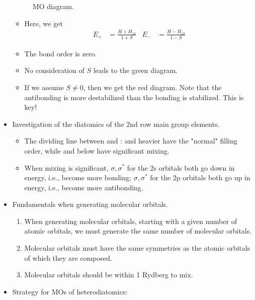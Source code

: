 \documentclass[../notes.tex]{subfiles}
\begin{document}
\begin{itemize}
\begin{figure}[H]
        \caption{ MO diagram.}
        \label{fig:MOsHe2}
    \end{figure}
    \begin{itemize}
        \item Here, we get
        \begin{align*}
            E_+ &= \frac{H+H_{12}}{1+S}&
            E_- &= \frac{H-H_{12}}{1-S}
        \end{align*}
        \item The bond order is zero.
        \item No consideration of $S$ leads to the green diagram.
        \item If we assume $S\neq 0$, then we get the red diagram. Note that the antibonding is more destabilized than the bonding is stabilized. This is key!
    \end{itemize}
    \item Investigation of the diatomics of the 2nd row main group elements.
    \begin{itemize}
        \item The dividing line between  and :  and heavier have the "normal" filling order, while  and below have significant mixing.
        \item When mixing is significant, $\sigma,\sigma^*$ for the 2s orbitals both go down in energy, i.e., become more bonding; $\sigma,\sigma^*$ for the 2p orbitals both go up in energy, i.e., become more antibonding.
    \end{itemize}
    \item Fundamentals when generating molecular orbitals.
    \begin{enumerate}
        \item When generating molecular orbitals, starting with a given number of atomic orbitals, we must generate the same number of molecular orbitals.
        \item Molecular orbitals must have the same symmetries as the atomic orbitals of which they are composed.
        \item Molecular orbitals should be within 1 Rydberg to mix.
    \end{enumerate}
    \item Strategy for MOs of heterodiatomics:
    \begin{enumerate}

\end{enumerate}
\end{itemize}
\end{document}
